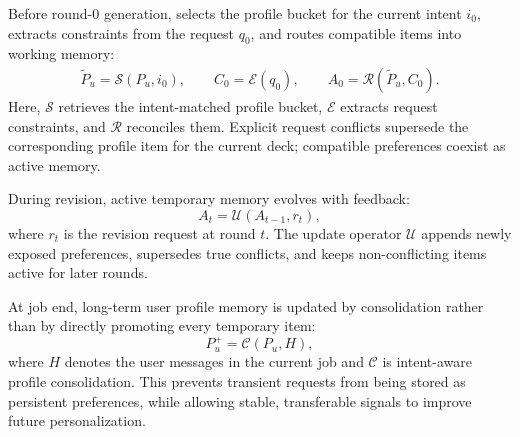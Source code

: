 Before round-0 generation, \methodname selects the profile bucket for the
current intent $i_0$, extracts constraints from the request $q_0$, and routes
compatible items into working memory:
\begin{equation}
\label{eq:profile_routing}
\begin{aligned}
\tilde P_u = \mathcal{S}\!\left(P_u, i_0\right),
\qquad
C_0 = \mathcal{E}\!\left(q_0\right),
\qquad
A_0 = \mathcal{R}\!\left(\tilde P_u, C_0\right).
\end{aligned}
\end{equation}
Here, $\mathcal{S}$ retrieves the intent-matched profile bucket, $\mathcal{E}$
extracts request constraints, and $\mathcal{R}$ reconciles them. Explicit
request conflicts supersede the corresponding profile item for the current deck;
compatible preferences coexist as active memory.

During revision, active temporary memory evolves with feedback:
\begin{equation}
\label{eq:working_memory_update}
A_t = \mathcal{U}\!\left(A_{t-1}, r_t\right),
\end{equation}
where $r_t$ is the revision request at round $t$. The update operator
$\mathcal{U}$ appends newly exposed preferences, supersedes true conflicts, and
keeps non-conflicting items active for later rounds.

At job end, long-term user profile memory is updated by consolidation rather
than by directly promoting every temporary item:
\begin{equation}
\label{eq:profile_consolidation}
P_u^{+} = \mathcal{C}\!\left(P_u, H\right),
\end{equation}
where $H$ denotes the user messages in the current job and $\mathcal{C}$ is
intent-aware profile consolidation.
This prevents transient requests from being stored as persistent preferences, while allowing stable, transferable signals to improve future personalization.


